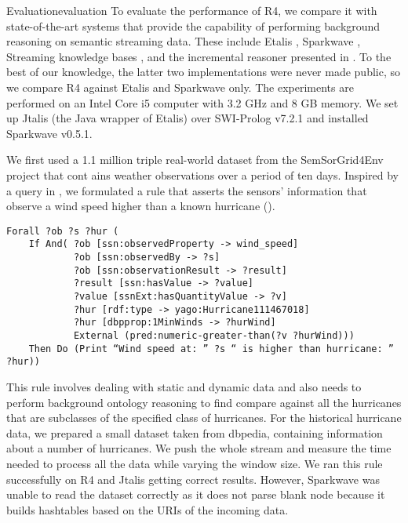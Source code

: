 \begin{nestedsection}{Evaluation}{evaluation}
	To evaluate the performance of R4, we compare it with state-of-the-art systems that provide the capability of performing background reasoning on semantic streaming data.
	These include Etalis \citep{EP-SPARQL}, Sparkwave \citep{sparkwave}, Streaming knowledge bases \citep{walavalkar08streamingkb}, and the incremental reasoner presented in \citep{inc-reasoning-background-knowledge}.
	To the best of our knowledge, the latter two implementations were never made public, so we compare R4 against Etalis and Sparkwave only.
	The experiments are performed on an Intel Core i5 computer with 3.2 GHz and 8 GB memory.
	We set up Jtalis (the Java wrapper of Etalis) over SWI-Prolog v7.2.1 and installed Sparkwave v0.5.1.

	We first used a 1.1 million triple real-world dataset from the SemSorGrid4Env project that cont ains weather observations over a period of ten days.
	Inspired by a query in \citep{SRBench}, we formulated a rule that asserts the sensors’ information that observe a wind speed higher than a known hurricane ().

	\begin{figure*}[t]
		\centering
		\begin{verbatim}
Forall ?ob ?s ?hur (
    If And( ?ob [ssn:observedProperty -> wind_speed]
            ?ob [ssn:observedBy -> ?s]
            ?ob [ssn:observationResult -> ?result]
            ?result [ssn:hasValue -> ?value]
            ?value [ssnExt:hasQuantityValue -> ?v]
            ?hur [rdf:type -> yago:Hurricane111467018]
            ?hur [dbpprop:1MinWinds -> ?hurWind]
            External (pred:numeric-greater-than(?v ?hurWind)))
    Then Do (Print “Wind speed at: ” ?s “ is higher than hurricane: ” ?hur))
		\end{verbatim}
		\caption{}
	\end{figure*}

	This rule involves dealing with static and dynamic data and also needs to perform background ontology reasoning to find compare against all the hurricanes that are subclasses of the specified class of hurricanes.
	For the historical hurricane data, we prepared a small dataset taken from dbpedia, containing information about a number of hurricanes.
	We push the whole stream and measure the time needed to process all the data while varying the window size. We ran this rule successfully on R4 and Jtalis getting correct results.
	However, Sparkwave was unable to read the dataset correctly as it does not parse blank node because it builds hashtables based on the URIs of the incoming data.


\end{nestedsection}
